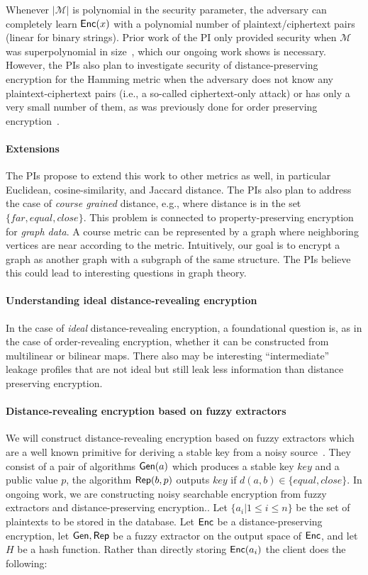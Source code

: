 Whenever $|\mathcal{M}|$ is polynomial in the security parameter, the adversary can completely learn $\mathsf{Enc}(x)$ with a polynomial number of plaintext/ciphertext pairs (linear for binary strings).  Prior work of the PI only provided security when $\mathcal{M}$ was superpolynomial in size~\cite{EPRINT:ABCFG16}, which our ongoing work shows is necessary.  However, the PIs also plan to investigate security of distance-preserving encryption for the Hamming metric when the adversary does not know any plaintext-ciphertext pairs (i.e., a so-called ciphertext-only attack) or has only a very small number of them, as was previously done for order preserving encryption~\cite{C:BolCheOne11}.
 
 \paragraph{Extensions} The PIs propose to extend this work to other metrics as well, in particular Euclidean, cosine-similarity, and Jaccard distance.    The PIs also plan to address the case of \emph{course grained} distance, e.g., where distance is in the set $\{far, equal, close\}$.  This problem is connected to property-preserving encryption for \emph{graph data}.  A course metric can be represented by a graph where neighboring vertices are near according to the metric.  Intuitively, our goal is to encrypt a graph as another graph with a subgraph of the same structure. The PIs believe this could lead to interesting questions in graph theory.

\paragraph{Understanding ideal distance-revealing encryption}
In the case of \emph{ideal} distance-revealing encryption, a foundational question is, as in the case of order-revealing encryption, whether it can be constructed from multilinear or bilinear maps.  There also may be interesting ``intermediate'' leakage profiles that are not ideal but still leak less information than distance preserving encryption. 

\paragraph{Distance-revealing encryption based on fuzzy extractors}
We will construct distance-revealing encryption based on fuzzy extractors which are a well known primitive for deriving a stable key from a noisy source~\cite{EC:DodReySmi04}.  They consist of a pair of algorithms $\mathsf{Gen}(a)$ which produces a stable key $key$ and a public value $p$, the algorithm $\mathsf{Rep}(b, p)$ outputs $key$ if $d(a,b)\in\{equal,close\}$.  In ongoing work, we are constructing noisy searchable encryption from fuzzy extractors and distance-preserving encryption..  Let $\{a_i | 1\le i \le n\}$ be the set of plaintexts to be stored in the database.  Let $\mathsf{Enc}$ be a distance-preserving encryption, let $\mathsf{Gen}, \mathsf{Rep}$ be a fuzzy extractor on the output space of $\mathsf{Enc}$, and let $H$ be a hash function.  Rather than directly storing $\mathsf{Enc}(a_i)$ the client does the following:

